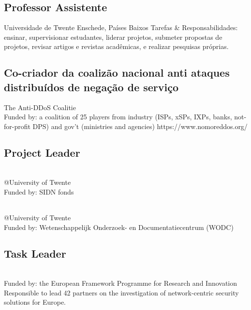\documentclass[print]{styles/friggeri-cv-mac} %
\begin{document}
\subsection{Professor Assistente}\vspace{-5pt}
\begin{entrylist}
		{Universidade de Twente}
	{Enschede, Países Baixos}
	{Tarefas \& Responsabilidades: ensinar, supervisionar estudantes, liderar projetos, submeter propostas de projetos, revisar artigos e revistas acadêmicas, e realizar pesquisas próprias.	}
\end{entrylist}

\subsection{Co-criador da coalizão nacional anti ataques distribuídos de negação de serviço}\vspace{-5pt}
\begin{entrylist}
	{The Anti-DDoS Coalitie}
{\\Funded by: a coalition of 25 players from industry (ISPs, xSPs, IXPs, banks, not-for-profit DPS) and gov’t (ministries and agencies)}
{https://www.nomoreddos.org/}
\end{entrylist}

\subsection{Project Leader}\vspace{-5pt}
\begin{entrylist}

{\\@University of Twente\\Funded by: SIDN fonds}%
{}

{\\@University of Twente\\Funded by: Wetenschappelijk Onderzoek- en Documentatiecentrum (WODC)}%
{}
\end{entrylist}
\subsection{Task Leader}\vspace{-5pt}
\begin{entrylist}
{\\Funded by: the European Framework Programme for Research and Innovation}
{Responsible to lead 42 partners on the investigation of network-centric security solutions for Europe.}%
\end{entrylist}
\end{document}
